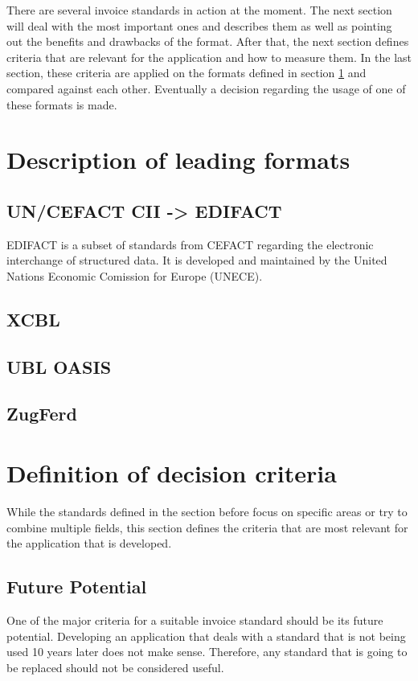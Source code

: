 \documentclass[english,mt]{lmedoc}
\begin{document}
There are several invoice standards in action at the moment. The next section will deal with the most important ones and describes them as well as pointing out the benefits and drawbacks of the format.
After that, the next section defines criteria that are relevant for the application and how to measure them.
In the last section, these criteria are applied on the formats defined in section \ref{sec2.1} and compared against each other. Eventually a decision regarding the usage of one of these formats is made.

\section{Description of leading formats}
\label{sec2.1}

\subsection{UN/CEFACT CII -> EDIFACT}
\label{sec2.1.1}

EDIFACT is a subset of standards from CEFACT regarding the electronic interchange of structured data. It is developed and maintained by the United Nations Economic Comission for Europe (UNECE). \cite{unece}

\subsection{XCBL}
\label{sec2.1.2}

\subsection{UBL OASIS}
\label{sec2.1.3}

\subsection{ZugFerd}
\label{sec.2.1.4}

\section{Definition of decision criteria}
\label{sec2.2}

While the standards defined in the section before focus on specific areas or try to combine multiple fields, this section defines the criteria that are most relevant for the application that is developed.

\subsection{Future Potential}
\label{sec2.2.1}
One of the major criteria for a suitable invoice standard should be its future potential. Developing an application that deals with a standard that is not being used 10 years later does not make sense. Therefore, any standard that is going to be replaced should not be considered useful.
\end{document}
